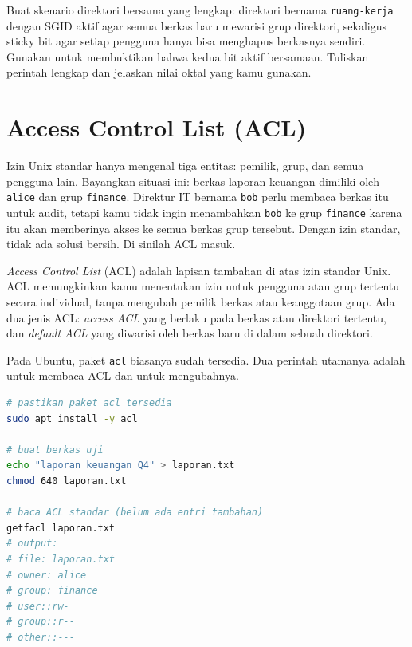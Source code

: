 \begin{challengebox}
Buat skenario direktori bersama yang lengkap: direktori bernama \texttt{ruang-kerja} dengan SGID aktif agar semua berkas baru mewarisi grup direktori, sekaligus sticky bit agar setiap pengguna hanya bisa menghapus berkasnya sendiri. Gunakan  untuk membuktikan bahwa kedua bit aktif bersamaan. Tuliskan perintah lengkap dan jelaskan nilai oktal yang kamu gunakan.
\end{challengebox}

\section{Access Control List (ACL)}
\label{sec:acls}

Izin Unix standar hanya mengenal tiga entitas: pemilik, grup, dan semua pengguna lain. Bayangkan situasi ini: berkas laporan keuangan dimiliki oleh \texttt{alice} dan grup \texttt{finance}. Direktur IT bernama \texttt{bob} perlu membaca berkas itu untuk audit, tetapi kamu tidak ingin menambahkan \texttt{bob} ke grup \texttt{finance} karena itu akan memberinya akses ke semua berkas grup tersebut. Dengan izin standar, tidak ada solusi bersih. Di sinilah ACL masuk.

\textit{Access Control List} (ACL) adalah lapisan tambahan di atas izin standar Unix. ACL memungkinkan kamu menentukan izin untuk pengguna atau grup tertentu secara individual, tanpa mengubah pemilik berkas atau keanggotaan grup. Ada dua jenis ACL: \textit{access ACL} yang berlaku pada berkas atau direktori tertentu, dan \textit{default ACL} yang diwarisi oleh berkas baru di dalam sebuah direktori.

Pada Ubuntu, paket \texttt{acl} biasanya sudah tersedia. Dua perintah utamanya adalah  untuk membaca ACL dan  untuk mengubahnya.

\begin{lstlisting}[language=bash, caption={Instalasi dan pengecekan ACL dasar}]
# pastikan paket acl tersedia
sudo apt install -y acl

# buat berkas uji
echo "laporan keuangan Q4" > laporan.txt
chmod 640 laporan.txt

# baca ACL standar (belum ada entri tambahan)
getfacl laporan.txt
# output:
# file: laporan.txt
# owner: alice
# group: finance
# user::rw-
# group::r--
# other::---
\end{lstlisting}

